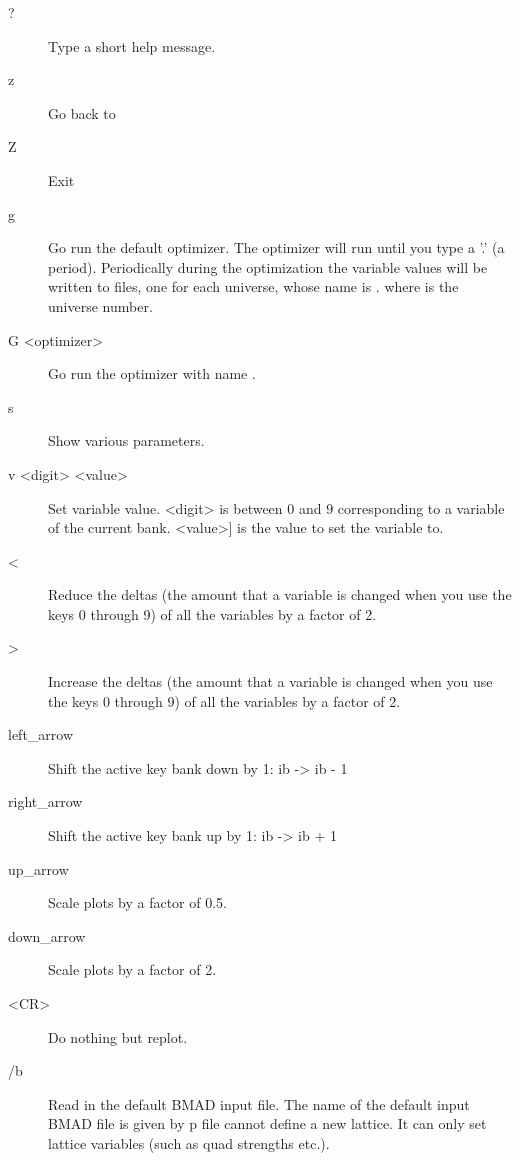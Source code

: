 \begin{description}
\item[?]
Type a short help message.

\item[z] 
Go back to 

\item[Z] 
Exit \tao
                                        
\item[g]
Go run the default optimizer. The optimizer will run until you type a 
'.' (a period).
Periodically during the optimization the variable values
will be written to files, one for each universe, whose name is 
. where \vn{#} is the universe number.

\item[G <optimizer>]
Go run the optimizer with name .

\item[s]  
Show various parameters.

\item[v <digit> <value>]
Set variable value. <digit> is between 0 and 9 corresponding
to a variable of the current bank. <value>] is the value to set the
variable to.

\item[<]
Reduce the deltas (the amount that a variable is changed when you use the
keys 0 through 9) of all the variables by a factor of 2.

\item[>]
Increase the deltas (the amount that a variable is changed when you use
the keys 0 through 9) of all the variables by a factor of 2.

\item[left_arrow]
Shift the active key bank down by 1: ib -> ib - 1

\item[right_arrow]
Shift the active key bank up by 1: ib -> ib + 1

\item[up_arrow]
Scale plots by a factor of 0.5.

\item[down_arrow]
Scale plots by a factor of 2.

\item[<CR>]
Do nothing but replot.

\item[/b] 
Read in the default BMAD input file.
The name of the default input BMAD file is given by p%
file cannot define a new lattice. It can only set lattice variables (such as
quad strengths etc.).


\end{description}
